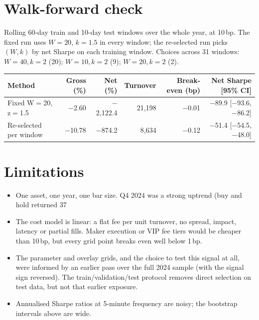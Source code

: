 \documentclass[11pt,a4paper]{article}
\begin{document}
\section{Walk-forward check}

Rolling 60-day train and 10-day test windows over the
whole year, at 10\,bp. The fixed run uses $W=20$, $k=1.5$ in
every window; the re-selected run picks $(W,k)$ by net Sharpe on each training
window. Choices across 31 windows: $W=40, k=2$ (20); $W=10, k=2$ (9); $W=20, k=2$ (2).

\begin{table}[H]
\centering\small
\begin{tabular}{lrrrrr}
\toprule
Method & Gross (\%) & Net (\%) & Turnover & Break-even (bp) & Net Sharpe [95\% CI] \\
\midrule
Fixed W$=$20, z$=$1.5 & $-$2.60 & $-$2,122.4 & 21,198 & $-$0.01 & $-$89.9 [$-$93.6, $-$86.2] \\
Re-selected per window & $-$10.78 & $-$874.2 & 8,634 & $-$0.12 & $-$51.4 [$-$54.5, $-$48.0] \\
\bottomrule
\end{tabular}
\end{table}

\section{Limitations}

\begin{itemize}
  \item One asset, one year, one bar size. Q4 2024 was a strong uptrend
        (buy and hold returned 37%
  \item The cost model is linear: a flat fee per unit turnover, no spread, impact,
        latency or partial fills. Maker execution or VIP fee tiers would be cheaper
        than 10\,bp, but every grid point breaks even well below 1\,bp.
  \item The parameter and overlay grids, and the choice to test this signal at all,
        were informed by an earlier pass over the full 2024 sample (with the
        signal sign reversed). The train/validation/test protocol removes direct
        selection on test data, but not that earlier exposure.
  \item Annualised Sharpe ratios at 5-minute frequency are noisy; the bootstrap
        intervals above are wide.
\end{itemize}
\end{document}
